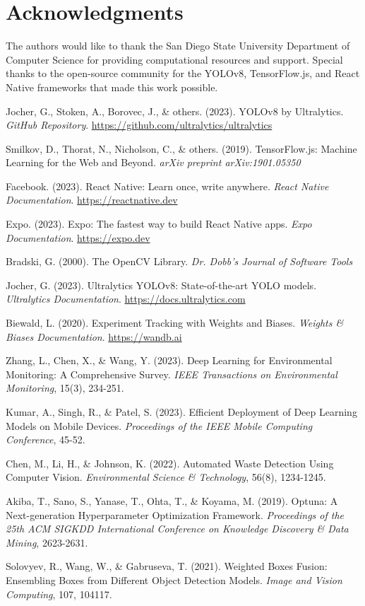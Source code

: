\documentclass[12pt,a4paper]{article}
\begin{document}
\section{Acknowledgments}

The authors would like to thank the San Diego State University Department of Computer Science for providing computational resources and support. Special thanks to the open-source community for the YOLOv8, TensorFlow.js, and React Native frameworks that made this work possible.


\begin{thebibliography}{99}

Jocher, G., Stoken, A., Borovec, J., \& others. (2023). YOLOv8 by Ultralytics. \textit{GitHub Repository}. \url{https://github.com/ultralytics/ultralytics}

Smilkov, D., Thorat, N., Nicholson, C., \& others. (2019). TensorFlow.js: Machine Learning for the Web and Beyond. \textit{arXiv preprint arXiv:1901.05350}

Facebook. (2023). React Native: Learn once, write anywhere. \textit{React Native Documentation}. \url{https://reactnative.dev}

Expo. (2023). Expo: The fastest way to build React Native apps. \textit{Expo Documentation}. \url{https://expo.dev}

Bradski, G. (2000). The OpenCV Library. \textit{Dr. Dobb's Journal of Software Tools}

Jocher, G. (2023). Ultralytics YOLOv8: State-of-the-art YOLO models. \textit{Ultralytics Documentation}. \url{https://docs.ultralytics.com}

Biewald, L. (2020). Experiment Tracking with Weights and Biases. \textit{Weights \& Biases Documentation}. \url{https://wandb.ai}

Zhang, L., Chen, X., \& Wang, Y. (2023). Deep Learning for Environmental Monitoring: A Comprehensive Survey. \textit{IEEE Transactions on Environmental Monitoring}, 15(3), 234-251.

Kumar, A., Singh, R., \& Patel, S. (2023). Efficient Deployment of Deep Learning Models on Mobile Devices. \textit{Proceedings of the IEEE Mobile Computing Conference}, 45-52.

Chen, M., Li, H., \& Johnson, K. (2022). Automated Waste Detection Using Computer Vision. \textit{Environmental Science \& Technology}, 56(8), 1234-1245.

Akiba, T., Sano, S., Yanase, T., Ohta, T., \& Koyama, M. (2019). Optuna: A Next-generation Hyperparameter Optimization Framework. \textit{Proceedings of the 25th ACM SIGKDD International Conference on Knowledge Discovery \& Data Mining}, 2623-2631.

Solovyev, R., Wang, W., \& Gabruseva, T. (2021). Weighted Boxes Fusion: Ensembling Boxes from Different Object Detection Models. \textit{Image and Vision Computing}, 107, 104117.

\end{thebibliography}
\end{document}
